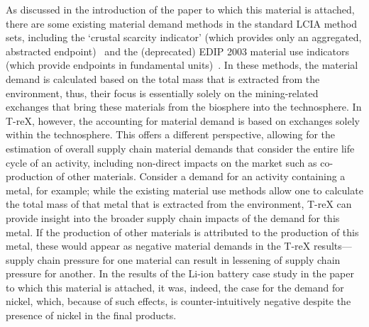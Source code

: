 \documentclass{article}
\begin{document}
As discussed in the introduction of the paper to which this material is attached, there are some existing material demand methods in the standard LCIA method sets, including the `crustal scarcity indicator' (which provides only an aggregated, abstracted endpoint)~\citep{arvidsson2020csi} and the (deprecated) EDIP 2003 material use indicators (which provide endpoints in fundamental units)~\citep{hauschild2003edip}. In these methods, the material demand is calculated based on the total mass that is extracted from the environment, thus, their focus is essentially solely on the mining-related exchanges that bring these materials from the biosphere into the technosphere. In T-reX, however, the accounting for material demand is based on exchanges solely within the technosphere. This offers a different perspective, allowing for the estimation of overall supply chain material demands that consider the entire life cycle of an activity, including non-direct impacts on the market such as co-production of other materials. Consider a demand for an activity containing a metal, for example; while the existing material use methods allow one to calculate the total mass of that metal that is extracted from the environment, T-reX can provide insight into the broader supply chain impacts of the demand for this metal. If the production of other materials is attributed to the production of this metal, these would appear as negative material demands in the T-reX results---supply chain pressure for one material can result in lessening of supply chain pressure for another. In the results of the Li-ion battery case study in the paper to which this material is attached, it was, indeed, the case for the demand for nickel, which, because of such effects, is counter-intuitively negative despite the presence of nickel in the final products.
\end{document}
